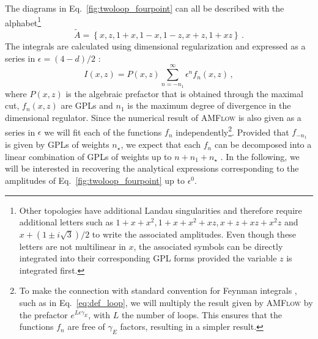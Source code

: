 \documentclass[a4paper,11pt]{article}
\begin{document}
The diagrams in Eq.~\eqref{fig:twoloop_fourpoint} can all be described with the alphabet\footnote{Other topologies have additional Landau singularities and therefore require additional letters such as $1+x+x^2, 1+x+x^2+xz, x+z+x z+x^2 z$ and $x+(1\pm i \sqrt{3})/2$ to write the associated amplitudes. Even though these letters are not multilinear in $x$, the associated symbols can be directly integrated into their corresponding GPL forms provided the variable $z$ is integrated first. 
}
\begin{equation}\label{eq:alphabet_two_loop}
    \tilde{A} = \left\{x, z, 1+x, 1-x, 1-z, x+z, 1+x z\right\} \,.
\end{equation}
The integrals are calculated using dimensional regularization and expressed as a series in $\epsilon=(4-d)/2$ : 
\begin{equation}
    I(x,z) = P(x,z) \sum_{n=-n_1}^\infty \epsilon^n f_n(x,z) \,,
\end{equation}
where  $P(x,z)$ is the algebraic prefactor that is obtained through the maximal cut, $f_n(x,z)$ are GPLs and $n_1$ is the maximum degree of divergence in the dimensional regulator.  Since the numerical result of \textsc{AMFlow} is also given as a series in $\epsilon$ we will fit each of the functions $f_n$ independently\footnote{To make the connection with standard convention for Feynman integrals \cite{Weinzierl:2022eaz}, such as in Eq.~\eqref{eq:def_loop}, we will multiply the result given by \textsc{AMFlow} by the prefactor $e^{L \epsilon \gamma_E}$, with $L$ the number of loops. This ensures that the functions $f_n$ are free of $\gamma_E$ factors, resulting in a simpler result.}. Provided that $f_{-n_1}$ is given by GPLs of weights $n_\star$, we expect that each $f_n$ can be decomposed into a linear combination of GPLs of weights up to $n+n_1+n_\star$ \cite{Henn:2013pwa,Henn:2014qga}. In the following, we will be interested in recovering the analytical expressions corresponding to the amplitudes of Eq.~\eqref{fig:twoloop_fourpoint} up to $\epsilon^0$.
\end{document}
